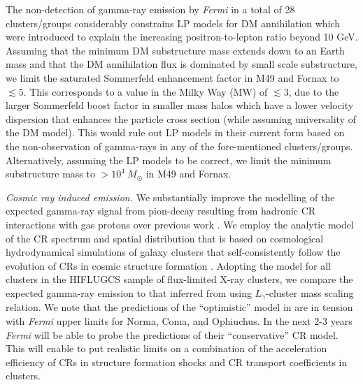 \documentclass[10pt,aps,pra,reprint,amsmath,amsfonts,amssymb,showpacs,nofootinbib,floatfix]{revtex4-1}
\newcommand{\Fermi}{{\em Fermi}\xspace}
\newcommand{\msun}{M_\odot}
\begin{document}
The non-detection of gamma-ray emission by \Fermi in a total of 28
clusters/groups considerably constrains LP models for DM annihilation
which were introduced to explain the increasing positron-to-lepton
ratio beyond 10 GeV. Assuming that the minimum DM substructure mass
extends down to an Earth mass and that the DM annihilation flux is
dominated by small scale substructure, we limit the saturated
Sommerfeld enhancement factor in M49 and Fornax to $\lesssim 5$. This
corresponds to a value in the Milky Way (MW) of $\lesssim3$, due to
the larger Sommerfeld boost factor in smaller mass halos which have a
lower velocity dispersion that enhances the particle cross section
(while assuming universality of the DM model). This would rule out LP
models in their current form based on the non-observation of
gamma-rays in any of the fore-mentioned
clusters/groups. Alternatively, assuming the LP models to be correct,
we limit the minimum substructure mass to $>10^4~\msun$ in M49 and
Fornax.

{\em Cosmic ray induced emission.} We substantially improve the
modelling of the expected gamma-ray signal from pion-decay resulting
from hadronic CR interactions with gas protons over previous work
\cite{2010ApJ...717L..71A}. We employ the analytic model of the CR
spectrum and spatial distribution that is based on cosmological
hydrodynamical simulations of galaxy clusters that self-consistently
follow the evolution of CRs in cosmic structure formation
\cite{2010MNRAS.409..449P}. Adopting the model for all clusters in the
HIFLUGCS sample of flux-limited X-ray clusters, we compare the
expected gamma-ray emission to that inferred from using
$L_\gamma$-cluster mass scaling relation. We note that the predictions
of the ``optimistic'' model in \cite{2010MNRAS.409..449P} are in
tension with \Fermi upper limits for Norma, Coma, and Ophiuchus. In
the next 2-3 years \Fermi will be able to probe the predictions of
their ``conservative'' CR model. This will enable to put realistic
limits on a combination of the acceleration efficiency of CRs in
structure formation shocks and CR transport coefficients in clusters.
\end{document}
